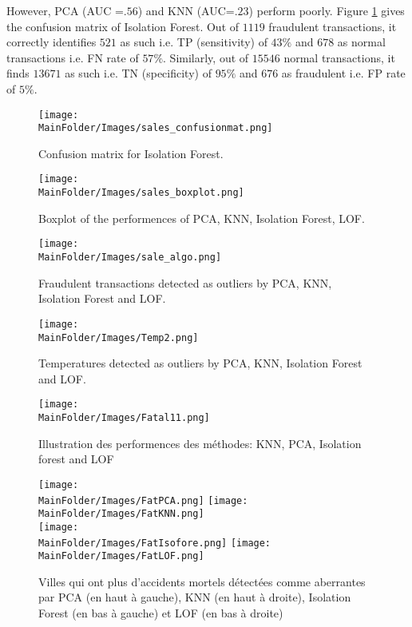  \noindent However, PCA (AUC =$.56$) and KNN (AUC=$.23$) perform poorly. Figure \ref{fig_sal13} gives the confusion matrix of Isolation Forest. Out of $1119$ fraudulent transactions, it correctly identifies $521$ as such i.e. TP (sensitivity) of $43 \%$ and $678$ as normal  transactions i.e. FN rate of $ 57 \%$. Similarly, out of $15546$ normal transactions, it finds $13671$ as such i.e. TN (specificity) of $95 \%$  and $676$ as fraudulent i.e. FP  rate of $ 5\%$. 
\begin{figure}[H]
  
    \texttt{[image: \\MainFolder/Images/sales\_confusionmat.png]}
  \caption{Confusion matrix for Isolation Forest.}
    \label{fig_sal13}
\end{figure}

\begin{figure}[H]
    \texttt{[image: \\MainFolder/Images/sales\_boxplot.png]}
    \label{fig_sal12}
    \caption{Boxplot of the performences of PCA, KNN, Isolation Forest, LOF.}%
\end{figure}


\begin{figure*}[ht!]
    \centering
    \texttt{[image: \\MainFolder/Images/sale\_algo.png]}
    \caption{Fraudulent transactions detected as outliers by PCA, KNN, Isolation Forest and LOF.}%
    \label{fig_sal2}
    \texttt{[image: \\MainFolder/Images/Temp2.png]}
    \caption{Temperatures detected as outliers by PCA, KNN, Isolation Forest and LOF.}%
    \label{fig2t1}
\end{figure*}
\begin{figure*}[ht!]
 \centering
     \texttt{[image: \\MainFolder/Images/Fatal11.png]}
    \caption{Illustration des performences des méthodes: KNN, PCA, Isolation forest and LOF}%
    \label{fig3}
\end{figure*}

\begin{figure*}[ht]
    \centering
    \texttt{[image: \\MainFolder/Images/FatPCA.png]}
    \texttt{[image: \\MainFolder/Images/FatKNN.png]}\\
    \texttt{[image: \\MainFolder/Images/FatIsofore.png]}
    \texttt{[image: \\MainFolder/Images/FatLOF.png]}
    \caption{Villes qui ont plus d'accidents mortels détectées comme aberrantes par PCA (en haut à gauche), KNN (en haut à droite), Isolation Forest (en bas à gauche) et LOF (en bas à droite)}%
    \label{fig2b}
\end{figure*}


\afterpage{\FloatBarrier}